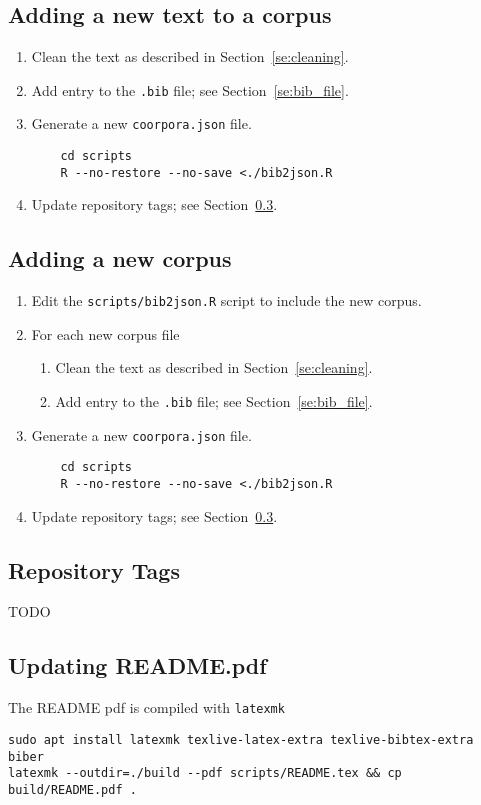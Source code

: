 \documentclass[a4paper,10pt]{paper}
\begin{document}
\subsection{Adding a new text to a corpus} \label{se:add_file}
\begin{enumerate}
    \item Clean the text as described in Section~\ref{se:cleaning}.
    \item Add entry to the \texttt{.bib} file; see Section~\ref{se:bib_file}. 
    \item Generate a new \texttt{coorpora.json} file.
        \begin{verbatim}
    cd scripts
    R --no-restore --no-save <./bib2json.R \end{verbatim}
    \item Update repository tags; see Section~\ref{se:tags}.
\end{enumerate}

\subsection{Adding a new corpus}
\begin{enumerate}
    \item Edit the \texttt{scripts/bib2json.R} script to include the new corpus.
    \item For each new corpus file
        \begin{enumerate}
            \item Clean the text as described in Section~\ref{se:cleaning}.
            \item Add entry to the \texttt{.bib} file; see Section~\ref{se:bib_file}. 
        \end{enumerate}
    \item Generate a new \texttt{coorpora.json} file.
        \begin{verbatim}
    cd scripts
    R --no-restore --no-save <./bib2json.R \end{verbatim}
    \item Update repository tags; see Section~\ref{se:tags}.
\end{enumerate}
\subsection{Repository Tags} \label{se:tags}
TODO

\subsection{Updating README.pdf} \label{se:update_readme}
The README pdf is compiled with \texttt{latexmk}
\begin{verbatim}
sudo apt install latexmk texlive-latex-extra texlive-bibtex-extra biber
latexmk --outdir=./build --pdf scripts/README.tex && cp build/README.pdf .
\end{verbatim}
\end{document}
